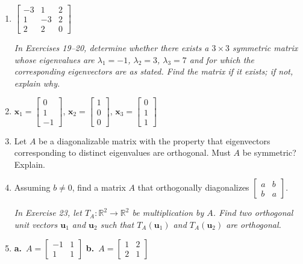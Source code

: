 \documentclass{article}
\theoremstyle{mystyle}
\begin{document}
\begin{enumerate}
\item[17.] $\begin{bmatrix}-3&1&2\\1&-3&2\\2&2&0\end{bmatrix}$

\noindent\textit{In Exercises 19--20, determine whether there exists a $3\times 3$
symmetric matrix whose eigenvalues are $\lambda_1=-1$, $\lambda_2=3$, $\lambda_3=7$ and
for which the corresponding eigenvectors are as stated. Find the matrix if it exists; if
not, explain why.}

\item[19.] $\mathbf{x}_1=\begin{bmatrix}0\\1\\-1\end{bmatrix}$,\quad
$\mathbf{x}_2=\begin{bmatrix}1\\0\\0\end{bmatrix}$,\quad
$\mathbf{x}_3=\begin{bmatrix}0\\1\\1\end{bmatrix}$

\item[21.] Let $A$ be a diagonalizable matrix with the property that eigenvectors
corresponding to distinct eigenvalues are orthogonal. Must $A$ be symmetric? Explain.

\item[22.] Assuming $b\neq 0$, find a matrix $A$ that orthogonally diagonalizes
$\begin{bmatrix}a&b\\b&a\end{bmatrix}$.

\noindent\textit{In Exercise 23, let $T_A\colon\mathbb{R}^2\to\mathbb{R}^2$ be
multiplication by $A$. Find two orthogonal unit vectors $\mathbf{u}_1$ and $\mathbf{u}_2$
such that $T_A(\mathbf{u}_1)$ and $T_A(\mathbf{u}_2)$ are orthogonal.}

\item[23.] \textbf{a.}\ $A=\begin{bmatrix}-1&1\\1&1\end{bmatrix}$
\hspace{20pt}
\textbf{b.}\ $A=\begin{bmatrix}1&2\\2&1\end{bmatrix}$


\end{enumerate}
\end{document}
